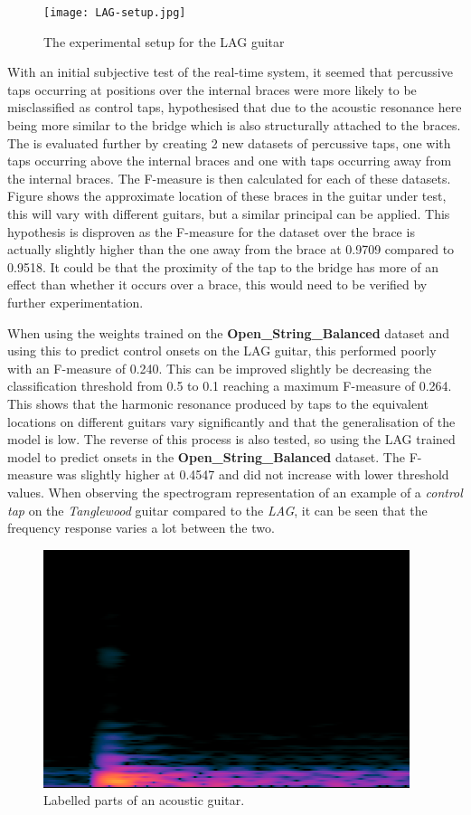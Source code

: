 \documentclass[conference]{IEEEtran}
\begin{document}
\begin{figure}[htbp]
    \centerline{\texttt{[image: LAG-setup.jpg]}}
    \caption{The experimental setup for the LAG guitar}
    \label{acoustic-bridge}
    \end{figure}

With an initial subjective test of the real-time system, it seemed that percussive taps occurring at positions over the internal braces were more likely to be misclassified as control taps, hypothesised that due to the acoustic resonance here being more similar to the bridge which is also structurally attached to
the braces. The is evaluated further by creating 2 new datasets of percussive taps, one with taps occurring above the internal braces and one with taps occurring away from the internal braces. The F-measure is then calculated for each of these datasets.
Figure shows the approximate location of these braces in the guitar under test, this will vary with different guitars, but a similar principal can be applied. This hypothesis is disproven as the F-measure for the dataset over the brace is actually slightly higher than the 
one away from the brace at 0.9709 compared to 0.9518. It could be that the proximity of the tap to the bridge has more of an effect than whether it occurs over a brace, this would need to be verified by further experimentation. 

When using the weights trained on the \textbf{Open\_String\_Balanced} dataset and using this to predict control onsets on the LAG guitar, this performed poorly with an F-measure of 0.240. This can be improved slightly be decreasing the classification threshold from 0.5 to 0.1 reaching
a maximum F-measure of 0.264. This shows that the harmonic resonance produced by taps to the equivalent locations on different guitars vary significantly and that the generalisation of the model is low. The reverse of this process is also tested, so using the LAG trained model to predict
onsets in the \textbf{Open\_String\_Balanced} dataset. The F-measure was slightly higher at 0.4547 and did not increase with lower threshold values. When observing the spectrogram representation of an example of a \emph{control tap} on the \emph{Tanglewood} guitar compared to the \emph{LAG},
it can be seen that the frequency response varies a lot between the two.

\begin{figure}[htbp]
    \centerline{\includegraphics[scale=0.4]{acoustic-bridge.png}}
    \caption{Labelled parts of an acoustic guitar. \cite{b3}}
    \label{acoustic-bridge}
    \end{figure}
\end{document}

